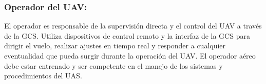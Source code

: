         \subsubsection{Operador del UAV:}
            \vspace{5px}
            El operador es responsable de la supervisión directa y el control del UAV a través de la GCS. Utiliza dispositivos de control remoto y la interfaz de la GCS para dirigir el vuelo, realizar ajustes en tiempo real y responder a cualquier eventualidad que pueda surgir durante la operación del UAV. El operador aéreo debe estar entrenado y ser competente en el manejo de los sistemas y procedimientos del UAS.\\

    










